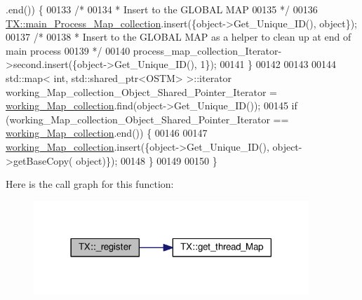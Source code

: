 \begin{DoxyCode}
      .end()) \{
00133         \textcolor{comment}{/*}
00134 \textcolor{comment}{         * Insert to the GLOBAL MAP 
}
00135 \textcolor{comment}{         */}
00136         \hyperlink{class_t_x_a1a45d726894190695314464d7cd97c29_a1a45d726894190695314464d7cd97c29}{TX::main\_Process\_Map\_collection}.insert(\{\textcolor{keywordtype}{object}->Get\_Unique\_ID(), \textcolor{keywordtype}{
      object}\});
00137         \textcolor{comment}{/*}
00138 \textcolor{comment}{         * Insert to the GLOBAL MAP as a helper to clean up at end of main process 
}
00139 \textcolor{comment}{         */}
00140         process\_map\_collection\_Iterator->second.insert(\{\textcolor{keywordtype}{object}->Get\_Unique\_ID(), 1\});
00141     \} 
00142 
00143 
00144     std::map< int, std::shared\_ptr<OSTM> >::iterator working\_Map\_collection\_Object\_Shared\_Pointer\_Iterator 
      = \hyperlink{class_t_x_a81aafda16e2f20e36ec6c68e584668ff_a81aafda16e2f20e36ec6c68e584668ff}{working\_Map\_collection}.find(object->Get\_Unique\_ID());
00145     \textcolor{keywordflow}{if} (working\_Map\_collection\_Object\_Shared\_Pointer\_Iterator == 
      \hyperlink{class_t_x_a81aafda16e2f20e36ec6c68e584668ff_a81aafda16e2f20e36ec6c68e584668ff}{working\_Map\_collection}.end()) \{
00146 
00147         \hyperlink{class_t_x_a81aafda16e2f20e36ec6c68e584668ff_a81aafda16e2f20e36ec6c68e584668ff}{working\_Map\_collection}.insert(\{\textcolor{keywordtype}{object}->Get\_Unique\_ID(), \textcolor{keywordtype}{object}->getBaseCopy(\textcolor{keywordtype}{
      object})\});
00148     \}
00149 
00150 \}
\end{DoxyCode}


Here is the call graph for this function\+:
\nopagebreak
\begin{figure}[H]
\begin{center}
\leavevmode
\includegraphics[width=294pt]{class_t_x_abc32af2f51df97ac483e5bfe7db6ca6e_abc32af2f51df97ac483e5bfe7db6ca6e_cgraph}
\end{center}
\end{figure}


